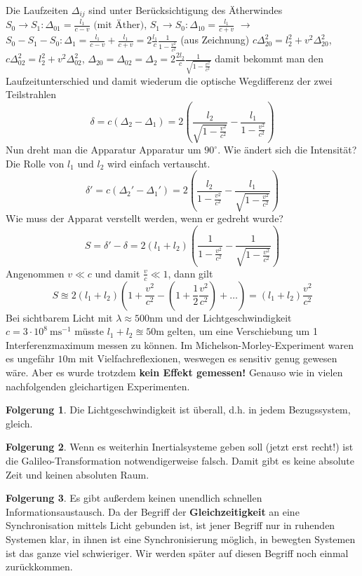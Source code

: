 \documentclass[oneside]{book}
\theoremstyle{definition}
\newtheorem*{folgerung*}{Folgerung}
\newcommand{\conseq}{$\rightarrow$~}
\begin{document}
Die Laufzeiten $\Delta_{ij}$ sind unter Berücksichtigung des Ätherwindes $S_0 \to S_1: \Delta_{01} = \frac{l_1}{c - v} \text{~(mit Äther)}$, $S_1 \to S_0: \Delta_{10} = \frac{l_1}{c + v}$ \conseq $S_0 - S_1 - S_0: \Delta_1 = \frac{l_1}{c-v} + \frac{l_1}{c+v} = 2 \frac{l_1}{c} \frac{1}{1 - \frac{v^2}{c^2}}$ (aus Zeichnung) $c\Delta_{20}^2 = l_2^2 + v^2 \Delta_{20}^2$, $c\Delta_{02}^2 = l_2^2 + v^2 \Delta_{02}^2$, $\Delta_{20} = \Delta_{02} = \Delta_{2} = 2 \frac{2l_2}{c} \frac{1}{\sqrt{1 - \frac{v^2}{c^2}}}$ damit bekommt man den Laufzeitunterschied und damit wiederum die optische Wegdifferenz der zwei Teilstrahlen
$$\delta = c (\Delta_2 - \Delta_1) = 2 \left(\frac{l_2}{\sqrt{1 - \frac{v^2}{c^2}}} - \frac{l_1}{1 - \frac{v^2}{c^2}}\right)$$ 
Nun dreht man die Apparatur Apparatur um $90^\circ$. Wie ändert sich die Intensität? Die Rolle von $l_1$ und $l_2$ wird einfach vertauscht.
$$\delta' = c (\Delta_2' - \Delta_1') = 2 \left(\frac{l_2}{1 - \frac{v^2}{c^2}} - \frac{l_1}{\sqrt{1 - \frac{v^2}{c^2}}}\right)$$
Wie muss der Apparat verstellt werden, wenn er gedreht wurde?
$$S = \delta' - \delta = 2(l_1 + l_2) \left(\frac{1}{1-\frac{v^2}{c^2}} - \frac{1}{\sqrt{1 - \frac{v^2}{c^2}}}\right)$$
Angenommen  $v \ll c$ und damit $\frac{v}{c} \ll 1$, dann gilt
$$S \approxeq 2 (l_1 + l_2) \left(1 + \frac{v^2}{c^2} - (1 + \frac{1}{2} \frac{v^2}{c^2}) + \dots\right) = (l_1 + l_2) \frac{v^2}{c^2}$$
Bei sichtbarem Licht mit $\lambda \approx 500 \mathrm{nm}$ und der Lichtgeschwindigkeit $c = 3 \cdot 10^8 ~\mathrm{m} \mathrm{s}^{-1}$ müsste $l_1 + l_2 \approxeq 50 \mathrm{m}$ gelten, um eine Verschiebung um 1 Interferenzmaximum messen zu können.
Im Michelson-Morley-Experiment waren es ungefähr $10 \mathrm{m}$ mit Vielfachreflexionen, weswegen es sensitiv genug gewesen wäre. Aber es wurde trotzdem \textbf{kein Effekt gemessen!} Genauso wie in vielen nachfolgenden gleichartigen Experimenten.

\begin{folgerung*}
	Die Lichtgeschwindigkeit ist überall, d.h. in jedem Bezugssystem, gleich.
\end{folgerung*}
\begin{folgerung*}
	Wenn es weiterhin Inertialsysteme geben soll (jetzt erst recht!) ist die Galileo-Transformation notwendigerweise falsch. Damit gibt es keine absolute Zeit und keinen absoluten Raum.
\end{folgerung*}
\begin{folgerung*}
	Es gibt außerdem keinen unendlich schnellen Informationsaustausch. Da der Begriff der \textbf{Gleichzeitigkeit} an eine Synchronisation mittels Licht gebunden ist, ist jener Begriff nur in ruhenden Systemen klar, in ihnen ist eine Synchronisierung möglich, in bewegten Systemen ist das ganze viel schwieriger. Wir werden später auf diesen Begriff noch einmal zurückkommen.
\end{folgerung*}
\end{document}

